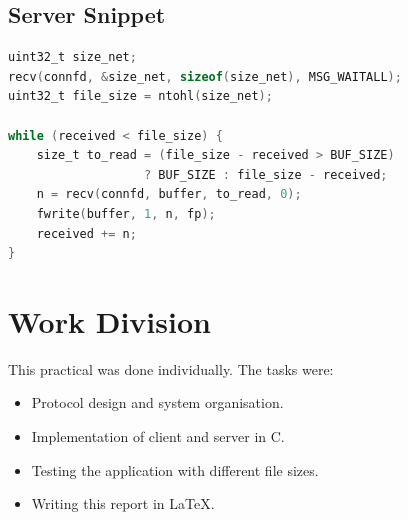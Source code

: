 \documentclass[a4paper,11pt]{article}
\begin{document}
\subsection*{Server Snippet}
\begin{lstlisting}[language=C,caption={Receiving the file},label={lst:server}]
uint32_t size_net;
recv(connfd, &size_net, sizeof(size_net), MSG_WAITALL);
uint32_t file_size = ntohl(size_net);

while (received < file_size) {
    size_t to_read = (file_size - received > BUF_SIZE)
                   ? BUF_SIZE : file_size - received;
    n = recv(connfd, buffer, to_read, 0);
    fwrite(buffer, 1, n, fp);
    received += n;
}
\end{lstlisting}

\section{Work Division}

This practical was done individually.  The tasks were:

\begin{itemize}
  \item Protocol design and system organisation.
  \item Implementation of client and server in C.
  \item Testing the application with different file sizes.
  \item Writing this report in \LaTeX.
\end{itemize}
\end{document}
